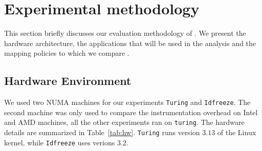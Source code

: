 
\section{Experimental methodology}
\label{sec:metho}

This section briefly discusses our evaluation methodology of \TABARNAC.
We present the hardware architecture, the applications that will be used in the analysis and the mapping policies to which we compare \TABARNAC.

\subsection{Hardware Environment}
\label{sec:expe-setup}

We used two NUMA machines for our experiments \texttt{Turing} and
\texttt{Idfreeze}. The second machine was only used to compare the
instrumentation overhead on Intel and AMD machines, all the other experiments
ran on \texttt{turing}. The hardware details are
summarized in Table~\ref{tab:hw}. \texttt{Turing} runs version $3.13$ of the
Linux kernel, while \texttt{Idfreeze} uses verions $3.2$.

%

%

